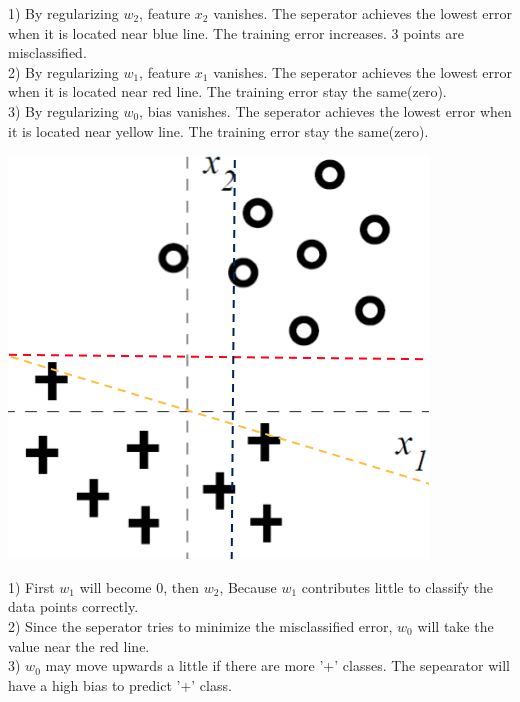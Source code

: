 \documentclass[12pt]{article}
\newenvironment{solution}[2][Solution]{\begin{trivlist}
\item[\hskip \labelsep {\bfseries #1}\hskip \labelsep {\bfseries #2.}]}{\end{trivlist}}
\begin{document}
\begin{solution}{3}
1) By regularizing $w_2$, feature $x_2$ vanishes. The seperator achieves the lowest error when it is located near blue line. The training error increases. 3 points are misclassified.\\
2) By regularizing $w_1$, feature $x_1$ vanishes. The seperator achieves the lowest error when it is located near red line. The training error stay the same(zero).\\
3) By regularizing $w_0$, bias vanishes. The seperator achieves the lowest error when it is located near yellow line. The training error stay the same(zero).
\begin{center}
\includegraphics[angle = 0, width = .4\textwidth]{./images/fig5.png}
\end{center}
\end{solution}

\begin{solution}{4}
1) First $w_1$ will become 0, then $w_2$, Because $w_1$ contributes little to classify the data points correctly.\\
2) Since the seperator tries to minimize the misclassified error, $w_0$ will take the value near the red line.\\
3) $w_0$ may move upwards a little if there are more '+' classes. The sepearator will have a high bias to predict '+' class.
\end{solution}
\end{document}
